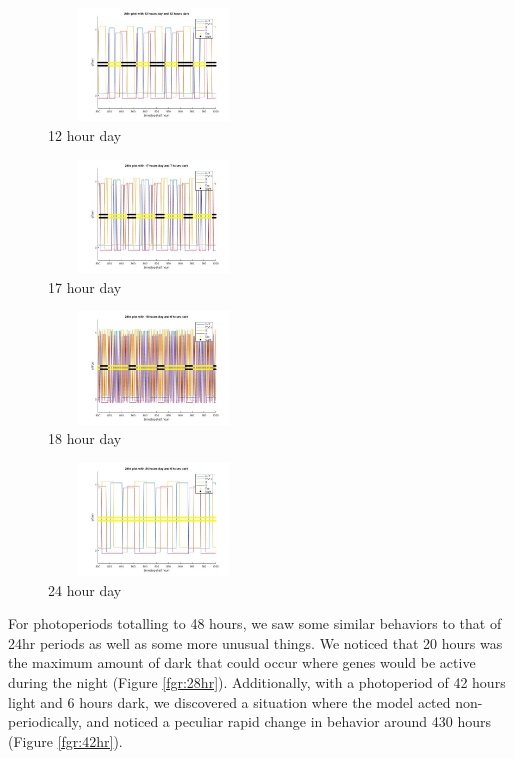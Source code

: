 \documentclass[twoside,twocolumn,9pt]{article}
\begin{document}
\begin{figure}[H]
\centering
  \includegraphics[width=0.50\textwidth,height=3cm]{12hrday}
  \caption{12 hour day}
  \label{fgr:12hr}
\end{figure}
\begin{figure}[H]
\centering
  \includegraphics[width=0.5\textwidth,height=3cm]{17hrday}
  \caption{17 hour day}
  \label{fgr:17hr}
\end{figure}
\begin{figure}[H]
\centering
  \includegraphics[width=0.5\textwidth,height=3cm]{18hrday}
  \caption{18 hour day}
  \label{fgr:18hr}
\end{figure}
\begin{figure}[H]
\centering
  \includegraphics[width=0.5\textwidth,height=3cm]{24hrdayJPG}
  \caption{24 hour day}
  \label{fgr:24hr}
\end{figure}


For photoperiods totalling to 48 hours, we saw some similar behaviors to that of 24hr periods as well as some more unusual things. We noticed that 20 hours was the maximum amount of dark that could occur where genes would be active during the night (Figure \ref{fgr:28hr}). Additionally, with a photoperiod of 42 hours light and 6 hours dark, we discovered a situation where the model acted non-periodically, and noticed a peculiar rapid change in behavior around 430 hours (Figure \ref{fgr:42hr}). 
\end{document}
